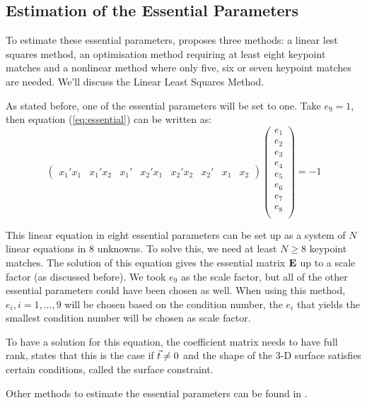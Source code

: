 \subsection{Estimation of the Essential Parameters}
To estimate these essential parameters, \cite{tekalp} proposes three methods: a linear lest squares method, an optimisation method requiring at least eight keypoint matches and a nonlinear method where only five, six or seven keypoint matches are needed. We'll discuss the Linear Least Squares Method.\bigskip

As stated before, one of the essential parameters will be set to one. Take $e_9 = 1$, then equation (\ref{eq:essential}) can be written as:
\begin{equation}
    \begin{pmatrix}
        x_1'x_1 &
        x_1'x_2 &
        x_1' &
        x_2'x_1 &
        x_2'x_2 &
        x_2' &
        x_1 &
        x_2
    \end{pmatrix}
    \begin{pmatrix}
        e_1 \\
        e_2 \\
        e_3 \\
        e_4 \\
        e_5 \\
        e_6 \\
        e_7 \\
        e_8 \\
    \end{pmatrix}
    = -1
\end{equation}

This linear equation in eight essential parameters can be set up as a system of $N$ linear equations in 8 unknowns. To solve this, we need at least $N \geq 8$ keypoint matches. The solution of this equation gives the essential matrix $\mathbf{E}$ up to a scale factor (as discussed before). We took $e_9$ as the scale factor, but all of the other essential parameters could have been chosen as well. When using this method, $e_i, i = 1,...,9$ will be chosen based on the condition number, the $e_i$ that yields the smallest condition number will be chosen as scale factor.\bigskip

To have a solution for this equation, the coefficient matrix needs to have full rank, \cite{tekalp} states that this is the case if $\vec t \neq 0$ and the shape of the 3-D surface satisfies certain conditions, called the surface constraint.

Other methods to estimate the essential parameters can be found in \cite{tekalp}.

